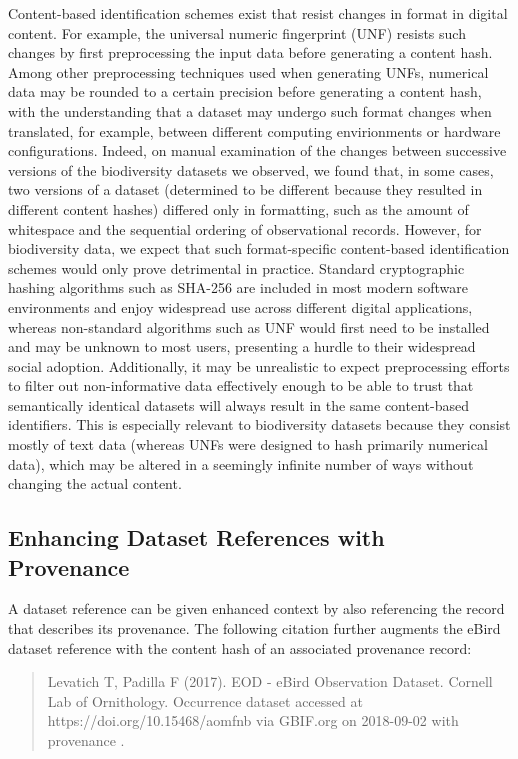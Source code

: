 Content-based identification schemes exist that resist changes in format in digital content. For example, the universal numeric fingerprint (UNF) \citep{Altman_2007} resists such changes by first preprocessing the input data before generating a content hash. Among other preprocessing techniques used when generating UNFs, numerical data may be rounded to a certain precision before generating a content hash, with the understanding that a dataset may undergo such format changes when translated, for example, between different computing envirionments or hardware configurations. Indeed, on manual examination of the changes between successive versions of the biodiversity datasets we observed, we found that, in some cases, two versions of a dataset (determined to be different because they resulted in different content hashes) differed only in formatting, such as the amount of whitespace and the sequential ordering of observational records. However, for biodiversity data, we expect that such format-specific content-based identification schemes would only prove detrimental in practice. Standard cryptographic hashing algorithms such as SHA-256 are included in most modern software environments and enjoy widespread use across different digital applications, whereas non-standard algorithms such as UNF would first need to be installed and may be unknown to most users, presenting a hurdle to their widespread social adoption. Additionally, it may be unrealistic to expect preprocessing efforts to filter out non-informative data effectively enough to be able to trust that semantically identical datasets will always result in the same content-based identifiers. This is especially relevant to biodiversity datasets because they consist mostly of text data (whereas UNFs were designed to hash primarily numerical data), which may be altered in a seemingly infinite number of ways without changing the actual content.

\subsection*{Enhancing Dataset References with Provenance}
A dataset reference can be given enhanced context by also referencing the record that describes its provenance. The following citation further augments the eBird dataset reference with the content hash of an associated provenance record:

\begin{quote}
Levatich T, Padilla F (2017). EOD - eBird Observation Dataset. Cornell Lab of Ornithology. Occurrence dataset  accessed at https://doi.org/10.15468/aomfnb via GBIF.org on 2018-09-02 with provenance .
\end{quote}

